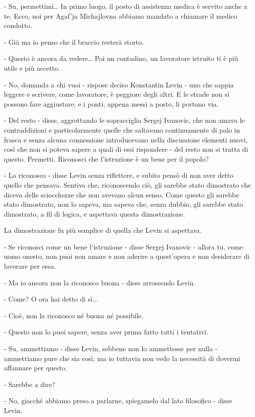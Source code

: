 - Su, permettimi\ldots{} In primo luogo, il posto di assistenza medica è servito anche a te. Ecco, noi per Agaf'ja Michajlovna abbiamo mandato a chiamare il medico condotto. 

- Già ma io penso che il braccio resterà storto. 

- Questo è ancora da vedere\ldots{} Poi un contadino, un lavoratore istruito ti è più utile e più accetto. 

- No, domanda a chi vuoi - rispose deciso Konstantin Levin - uno che sappia leggere e scrivere, come lavoratore, è peggiore degli altri. E le strade non si possono fare aggiustare; e i ponti, appena messi a posto, li portano via. 

- Del resto - disse, aggrottando le sopracciglia Sergej Ivanovic, che non amava le contraddizioni e particolarmente quelle che saltavano continuamente di palo in frasca e senza alcuna connessione introducevano nella discussione elementi nuovi, così che non si poteva sapere a quali di essi rispondere - del resto non si tratta di questo. Permetti. Riconosci che l'istruzione è un bene per il popolo? 

- Lo riconosco - disse Levin senza riflettere, e subito pensò di non aver detto quello che pensava. Sentiva che, riconoscendo ciò, gli sarebbe stato dimostrato che diceva delle sciocchezze che non avevano alcun senso. Come questo gli sarebbe stato dimostrato, non lo sapeva, ma sapeva che, senza dubbio, gli sarebbe stato dimostrato, a fil di logica, e aspettava questa dimostrazione. 

La dimostrazione fu più semplice di quella che Levin si aspettava. 

- Se riconosci come un bene l'istruzione - disse Sergej Ivanovic - allora tu, come uomo onesto, non puoi non amare e non aderire a quest'opera e non desiderare di lavorare per essa. 

- Ma io ancora non la riconosco buona - disse arrossendo Levin. 

- Come? O ora hai detto di sì\ldots{} 

- Cioè, non la riconosco né buona né possibile. 

- Questo non lo puoi sapere, senza aver prima fatto tutti i tentativi. 

- Su, ammettiamo - disse Levin, sebbene non lo ammettesse per nulla - ammettiamo pure che sia così; ma io tuttavia non vedo la necessità di dovermi affannare per questo. 

- Sarebbe a dire? 

- No, giacché abbiamo preso a parlarne, spiegamelo dal lato filosofico - disse Levin. 

